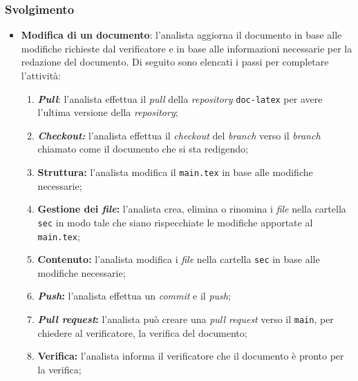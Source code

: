 \subsubsection{Svolgimento}
\begin{itemize}
	\item \textbf{Modifica di un documento}: l'analista aggiorna il documento in
	      base alle modifiche richieste dal verificatore e in base alle
	      informazioni necessarie per la redazione del documento. Di seguito sono
	      elencati i passi per completare l'attività:
	      \begin{enumerate}
		      \item \textbf{\textit{Pull}}: l'analista effettua il \textit{pull}
		            della \textit{repository\g} \texttt{doc-latex} per avere
		            l'ultima versione della \textit{repository\g};

		      \item \textbf{\textit{Checkout:}} l'analista effettua il
		            \textit{checkout} del \textit{branch} verso il
		            \textit{branch} chiamato come il documento che si sta
		            redigendo;

		      \item \textbf{Struttura:} l'analista modifica il
		            \texttt{main.tex} in base alle modifiche necessarie;

		      \item \textbf{Gestione dei \textit{file}:} l'analista crea,
		            elimina o rinomina i \textit{file} nella cartella
		            \texttt{sec} in modo tale che siano rispecchiate le
		            modifiche apportate al \texttt{main.tex};

		      \item \textbf{Contenuto:} l'analista modifica i \textit{file}
		            nella cartella \texttt{sec} in base alle modifiche
		            necessarie;

		      \item \textbf{\textit{Push}:} l'analista effettua un
		            \textit{commit} e il \textit{push};

		      \item \textbf{\textit{Pull request}:} l'analista può creare
		            una \textit{pull request} verso il \texttt{main},
		            per chiedere al verificatore, la verifica del documento;

		      \item \textbf{Verifica:} l'analista informa il verificatore
		            che il documento è pronto per la verifica;


\end{enumerate}
\end{itemize}
